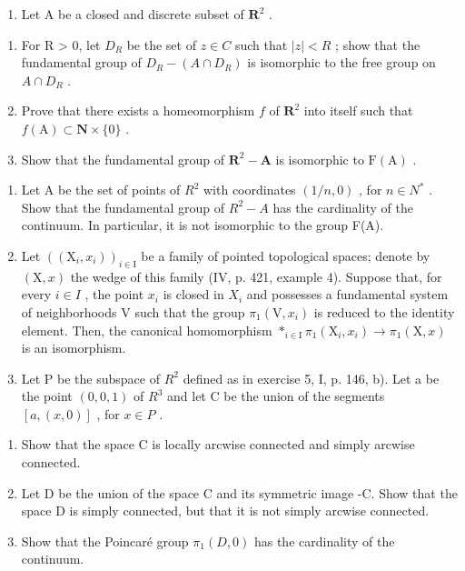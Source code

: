 \exercisegroup

\begin{enumerate}
\def\labelenumi{\arabic{enumi})}
\tightlist
\item
  Let A be a closed and discrete subset of \(\mathbf{R}^2\) .
\end{enumerate}

\begin{enumerate}
\def\labelenumi{\alph{enumi})}
\item
  For R \textgreater{} 0, let \(D_{R}\) be the set of \(z \in C\) such that \(|z| < R\) ; show that the fundamental group of \(D_{R} - (A \cap D_{R})\) is isomorphic to the free group on \(A \cap D_{R}\) .
\item
  Prove that there exists a homeomorphism \(f\) of \(\mathbf{R}^{2}\) into itself such that \(f(\mathrm{A})\subset\mathbf{N}\times\{0\}\) .
\item
  Show that the fundamental group of \(\mathbf{R}^2 - \mathbf{A}\) is isomorphic to \(\mathrm{F(A)}\) .
\end{enumerate}

\begin{enumerate}
\def\labelenumi{\arabic{enumi})}
\setcounter{enumi}{1}
\item
  Let A be the set of points of \(R^{2}\) with coordinates \((1/n,0)\) , for \(n\in N^{*}\) . Show that the fundamental group of \(R^{2}-A\) has the cardinality of the continuum. In particular, it is not isomorphic to the group F(A).
\item
  Let \(((\mathrm{X}_{i}, x_{i}))_{i \in \mathrm{I}}\) be a family of pointed topological spaces; denote by \((\mathrm{X}, x)\) the wedge of this family (IV, p. 421, example 4). Suppose that, for every \(i \in I\) , the point \(x_{i}\) is closed in \(X_{i}\) and possesses a fundamental system of neighborhoods V such that the group \(\pi_{1}(\mathrm{V}, x_{i})\) is reduced to the identity element. Then, the canonical homomorphism \(*_{i \in \mathrm{I}} \pi_{1}(\mathrm{X}_{i}, x_{i}) \to \pi_{1}(\mathrm{X}, x)\) is an isomorphism.
\item
  Let P be the subspace of \(R^{2}\) defined as in exercise 5, I, p. 146, b). Let a be the point \((0,0,1)\) of \(R^{3}\) and let C be the union of the segments \([a,(x,0)]\) , for \(x \in P\) .
\end{enumerate}

\begin{enumerate}
\def\labelenumi{\alph{enumi})}
\item
  Show that the space C is locally arcwise connected and simply arcwise connected.
\item
  Let D be the union of the space C and its symmetric image -C. Show that the space D is simply connected, but that it is not simply arcwise connected.
\item
  Show that the Poincaré group \(\pi_{1}(D,0)\) has the cardinality of the continuum.
\end{enumerate}

